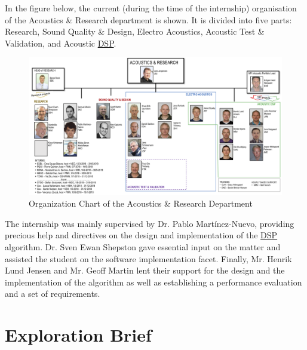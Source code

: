 In the figure below, the current (during the time of the internship) organisation of the Acoustics \& Research department is shown. It is divided into five parts: Research, Sound Quality \& Design, Electro Acoustics, Acoustic Test \& Validation, and Acoustic \hyperlink{DSP}{DSP}.

\begin{figure}[ht!]
		\centering
			\includegraphics[scale =0.25]{research.png}
			\caption{Organization Chart of the Acoustics \& Research Department}\label{Figure 2.2}

\end{figure}

The internship was mainly supervised by Dr. Pablo Martínez-Nuevo, providing precious help and directives on the design and implementation of the \hyperlink{DSP}{DSP} algorithm. Dr. Sven Ewan Shepston gave essential input on the matter and assisted the student on the software implementation facet. Finally, Mr. Henrik Lund Jensen and Mr. Geoff Martin lent their support for the design and the implementation of the algorithm as well as establishing a performance evaluation and a set of requirements.

\newpage


\section{Exploration Brief}

